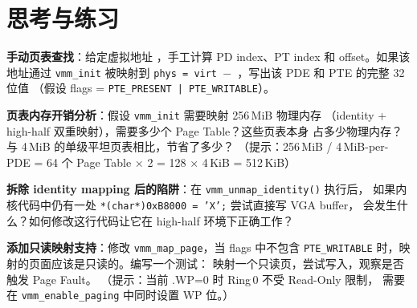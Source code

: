 \section{思考与练习}

\begin{exercise}
\textbf{手动页表查找}：给定虚拟地址 ，手工计算 PD index、PT index
和 offset。如果该地址通过 \texttt{vmm\_init} 被映射到
\texttt{phys = virt $-$ }，写出该 PDE 和 PTE 的完整 32 位值
（假设 flags = \texttt{PTE\_PRESENT | PTE\_WRITABLE}）。
\end{exercise}

\begin{exercise}
\textbf{页表内存开销分析}：假设 \texttt{vmm\_init} 需要映射 256\,MiB 物理内存
（identity + high-half 双重映射），需要多少个 Page Table？这些页表本身
占多少物理内存？与 4\,MiB 的单级平坦页表相比，节省了多少？
（提示：256\,MiB / 4\,MiB-per-PDE = 64 个 Page Table × 2 = 128 × 4\,KiB = 512\,KiB）
\end{exercise}

\begin{exercise}
\textbf{拆除 identity mapping 后的陷阱}：在 \texttt{vmm\_unmap\_identity()} 执行后，
如果内核代码中仍有一处 \texttt{*(char*)0xB8000 = 'X';} 尝试直接写 VGA buffer，
会发生什么？如何修改这行代码让它在 high-half 环境下正确工作？
\end{exercise}

\begin{exercise}
\textbf{添加只读映射支持}：修改 \texttt{vmm\_map\_page}，当 flags 中不包含
\texttt{PTE\_WRITABLE} 时，映射的页面应该是只读的。编写一个测试：
映射一个只读页，尝试写入，观察是否触发 Page Fault。
（提示：当前 .WP=0 时 Ring\,0 不受 Read-Only 限制，
需要在 \texttt{vmm\_enable\_paging} 中同时设置 WP 位。）
\end{exercise}

